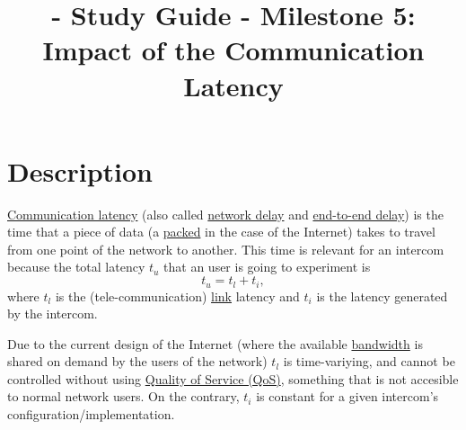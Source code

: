 \title{\TM - Study Guide - Milestone 5: Impact of the Communication Latency}

\maketitle

\section{Description}

\href{https://en.wikipedia.org/wiki/Latency_(engineering)#Communication_latency}{Communication
  latency} (also called
\href{https://en.wikipedia.org/wiki/Network_delay}{network delay} and
\href{https://en.wikipedia.org/wiki/End-to-end_delay}{end-to-end
  delay}) is the time that a piece of data (a
\href{https://en.wikipedia.org/wiki/Network_packet}{packed} in the
case of the Internet) takes to travel from one point of the network to
another. This time is relevant for an intercom because the total latency $t_u$ that an user is going to experiment is
\begin{equation}
  t_u = t_l + t_i,
  \label{eq:user_latency}
\end{equation}
where $t_l$ is the (tele-communication)
\href{https://en.wikipedia.org/wiki/Telecommunications_link}{link}
latency and $t_i$ is the latency generated by the intercom.

Due to the current design of the Internet (where the available
\href{https://en.wikipedia.org/wiki/Bandwidth_(computing)}{bandwidth}
is shared on demand by the users of the network) $t_l$ is
time-variying, and cannot be controlled without using
\href{https://en.wikipedia.org/wiki/Quality_of_service}{Quality of
  Service (QoS)}, something that is not accesible to normal network
users. On the contrary, $t_i$ is constant for a given intercom's
configuration/implementation.

